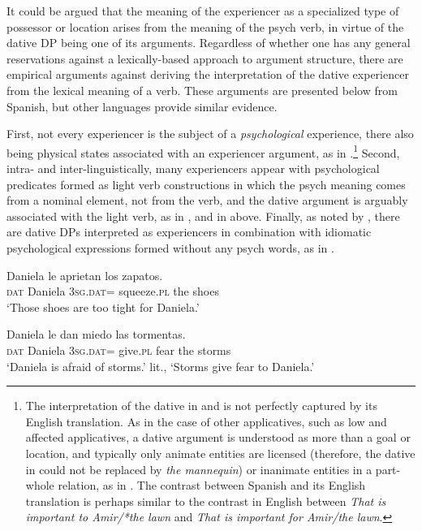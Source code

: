 \documentclass[output=paper,colorlinks,citecolor=brown,modfonts,nonflat]{langsci/langscibook}
\begin{document}
It could be argued that the meaning of the experiencer as a specialized type of possessor or location arises from the meaning of the psych verb, in virtue of the dative DP being one of its arguments. Regardless of whether one has any general reservations against a lexically-based approach to argument structure, there are empirical arguments against deriving the interpretation of the dative experiencer from the lexical meaning of a verb. These arguments are presented below from Spanish, but other languages provide similar evidence.

\largerpage
First, not every experiencer is the subject of a \textit{psychological} experience, there also being physical states associated with an experiencer argument, as in .\footnote{The interpretation of the dative in  and  is not perfectly captured by its English translation. As in the case of other applicatives, such as low and affected applicatives, a dative argument is understood as more than a goal or location, and typically only animate entities are licensed (therefore, the dative in  could not be replaced by \textit{the mannequin}) or inanimate entities in a part-whole relation, as in . The contrast between Spanish  and its English translation is perhaps similar to the contrast in English between \textit{That is important to Amir/*the lawn} and \textit{That is important for Amir/the lawn}.} Second, intra- and inter-linguistically, many experiencers appear with psychological predicates formed as light verb constructions in which the psych meaning comes from a nominal element, not from the verb, and the dative argument is arguably associated with the light verb, as in , and in  above. Finally, as noted by \citet{DiTullio2015}, there are dative DPs interpreted as experiencers in combination with idiomatic psychological expressions formed without any psych words, as in .

\ea%
    \label{ex:cuervo:16}
     {Daniela} {le}   {aprietan}  {los} {zapatos}.\\
    \textsc{dat} Daniela  3\textsc{sg.dat}= squeeze.\textsc{pl}   the shoes\\
    \glt ‘Those shoes are too tight for Daniela.’
    \z

\ea%
    \label{ex:cuervo:17}
     {Daniela} {le}   {dan}   {miedo}  {las} {tormentas}.\\
    \textsc{dat} Daniela  3\textsc{sg.dat}= give.\textsc{pl}  fear  the storms\\
    \glt ‘Daniela is afraid of storms.’ lit., ‘Storms give fear to Daniela.’
    \z
\end{document}
